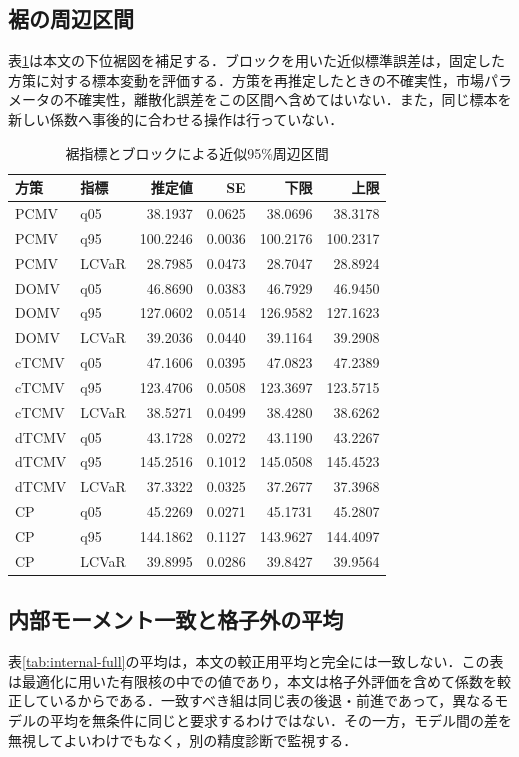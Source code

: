 \documentclass[11pt,a4paper]{article}
\numberwithin{equation}{section}
\numberwithin{table}{section}
\numberwithin{figure}{section}
\theoremstyle{plain}
\theoremstyle{definition}
\begin{document}
\subsection{裾の周辺区間}
表\ref{tab:tails-full}は本文の下位裾図を補足する．ブロックを用いた近似標準誤差は，固定した方策に対する標本変動を評価する．方策を再推定したときの不確実性，市場パラメータの不確実性，離散化誤差をこの区間へ含めてはいない．また，同じ標本を新しい係数へ事後的に合わせる操作は行っていない．

\begin{table}[htbp]\centering\small
\caption{裾指標とブロックによる近似95\%周辺区間}\label{tab:tails-full}
\begin{tabular}{llrrrr}\toprule
方策 & 指標 & 推定値 & SE & 下限 & 上限 \\ \midrule
PCMV & q05 & 38.1937 & 0.0625 & 38.0696 & 38.3178 \\
PCMV & q95 & 100.2246 & 0.0036 & 100.2176 & 100.2317 \\
PCMV & LCVaR & 28.7985 & 0.0473 & 28.7047 & 28.8924 \\
DOMV & q05 & 46.8690 & 0.0383 & 46.7929 & 46.9450 \\
DOMV & q95 & 127.0602 & 0.0514 & 126.9582 & 127.1623 \\
DOMV & LCVaR & 39.2036 & 0.0440 & 39.1164 & 39.2908 \\
cTCMV & q05 & 47.1606 & 0.0395 & 47.0823 & 47.2389 \\
cTCMV & q95 & 123.4706 & 0.0508 & 123.3697 & 123.5715 \\
cTCMV & LCVaR & 38.5271 & 0.0499 & 38.4280 & 38.6262 \\
dTCMV & q05 & 43.1728 & 0.0272 & 43.1190 & 43.2267 \\
dTCMV & q95 & 145.2516 & 0.1012 & 145.0508 & 145.4523 \\
dTCMV & LCVaR & 37.3322 & 0.0325 & 37.2677 & 37.3968 \\
CP & q05 & 45.2269 & 0.0271 & 45.1731 & 45.2807 \\
CP & q95 & 144.1862 & 0.1127 & 143.9627 & 144.4097 \\
CP & LCVaR & 39.8995 & 0.0286 & 39.8427 & 39.9564 \\
\bottomrule\end{tabular}\end{table}

\subsection{内部モーメント一致と格子外の平均}
表\ref{tab:internal-full}の平均は，本文の較正用平均と完全には一致しない．この表は最適化に用いた有限核の中での値であり，本文は格子外評価を含めて係数を較正しているからである．一致すべき組は同じ表の後退・前進であって，異なるモデルの平均を無条件に同じと要求するわけではない．その一方，モデル間の差を無視してよいわけでもなく，別の精度診断で監視する．
\end{document}
